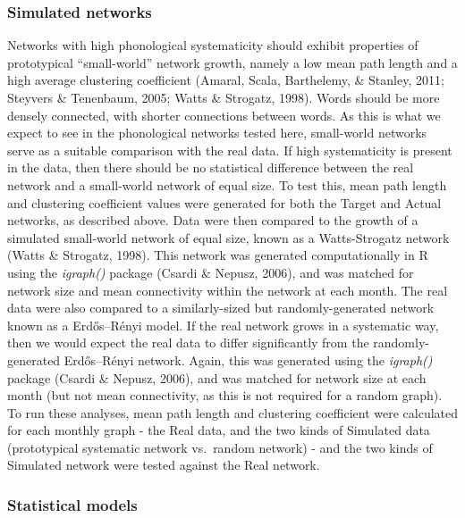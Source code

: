 \documentclass[
  man]{apa6}
\begin{document}
\subsubsection{Simulated networks}\label{simulated-networks}

Networks with high phonological systematicity should exhibit properties of prototypical ``small-world'' network growth, namely a low mean path length and a high average clustering coefficient (Amaral, Scala, Barthelemy, \& Stanley, 2011; Steyvers \& Tenenbaum, 2005; Watts \& Strogatz, 1998). Words should be more densely connected, with shorter connections between words. As this is what we expect to see in the phonological networks tested here, small-world networks serve as a suitable comparison with the real data. If high systematicity is present in the data, then there should be no statistical difference between the real network and a small-world network of equal size. To test this, mean path length and clustering coefficient values were generated for both the Target and Actual networks, as described above. Data were then compared to the growth of a simulated small-world network of equal size, known as a Watts-Strogatz network (Watts \& Strogatz, 1998). This network was generated computationally in R using the \emph{igraph()} package (Csardi \& Nepusz, 2006), and was matched for network size and mean connectivity within the network at each month. The real data were also compared to a similarly-sized but randomly-generated network known as a Erdős--Rényi model. If the real network grows in a systematic way, then we would expect the real data to differ significantly from the randomly-generated Erdős--Rényi network. Again, this was generated using the \emph{igraph()} package (Csardi \& Nepusz, 2006), and was matched for network size at each month (but not mean connectivity, as this is not required for a random graph). To run these analyses, mean path length and clustering coefficient were calculated for each monthly graph - the Real data, and the two kinds of Simulated data (prototypical systematic network vs.~random network) - and the two kinds of Simulated network were tested against the Real network.

\subsubsection{Statistical models}\label{statistical-models}
\end{document}
